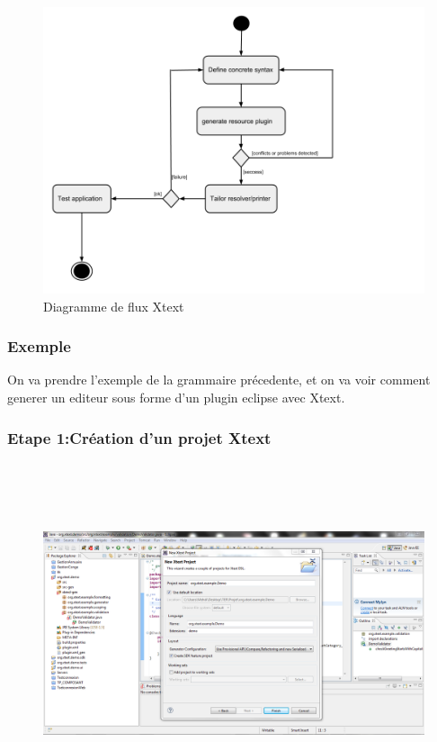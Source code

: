 \documentclass{article}
\begin{document}
\begin{figure}[h]
	\centering
		\includegraphics[width=1.10\textwidth]{DiagrammeFluxXtext.png}
	\caption{Diagramme de flux Xtext}
	\label{fig:DiagrammeFluxXtext}
\end{figure}\FloatBarrier

\subsubsection{Exemple}
On va prendre l'exemple de la grammaire précedente, et on va voir comment generer un editeur sous forme d'un plugin eclipse avec Xtext.
\subsubsection{Etape 1:Création d'un projet Xtext}


\begin{figure}[h]
	\centering
		\includegraphics[width=1.10\textwidth,height=10cm]{1.PNG}
	\label{fig:1}
\end{figure}\FloatBarrier
\end{document}

